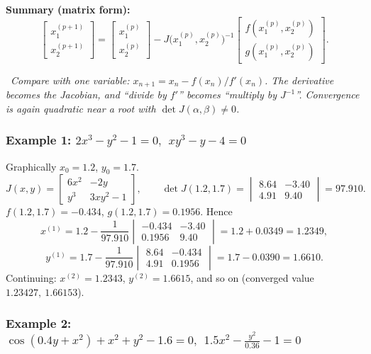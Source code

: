 \documentclass[hidelinks]{article}
\newcommand{\callout}[1]{\par\smallskip\noindent{\color{capri}$\blacktriangleright$}\ \textit{#1}\par\smallskip}
\begin{document}
\textbf{Summary (matrix form):}
\[
\begin{bmatrix}x_1^{(p+1)}\\x_2^{(p+1)}\end{bmatrix}=\begin{bmatrix}x_1^{(p)}\\x_2^{(p)}\end{bmatrix}-J\big(x_1^{(p)},x_2^{(p)}\big)^{-1}\begin{bmatrix}f(x_1^{(p)},x_2^{(p)})\\ g(x_1^{(p)},x_2^{(p)})\end{bmatrix}.
\]
\callout{Compare with one variable: $x_{n+1}=x_n-f(x_n)/f'(x_n)$. The derivative becomes the Jacobian, and ``divide by $f'$'' becomes ``multiply by $J^{-1}$''. Convergence is again quadratic near a root with $\det J(\alpha,\beta)\neq0$.}

\subsubsection{Example 1: $2x^3-y^2-1=0,\ \ xy^3-y-4=0$}

Graphically $x_0=1.2$, $y_0=1.7$.
\[
J(x,y)=\begin{bmatrix}6x^2&-2y\\ y^3&3xy^2-1\end{bmatrix},\qquad
\det J(1.2,1.7)=\begin{vmatrix}8.64&-3.40\\4.91&9.40\end{vmatrix}=97.910 .
\]
$f(1.2,1.7)=-0.434$, $g(1.2,1.7)=0.1956$. Hence
\[
x^{(1)}=1.2-\frac{1}{97.910}\begin{vmatrix}-0.434&-3.40\\0.1956&9.40\end{vmatrix}=1.2+0.0349=1.2349,
\]
\[
y^{(1)}=1.7-\frac{1}{97.910}\begin{vmatrix}8.64&-0.434\\4.91&0.1956\end{vmatrix}=1.7-0.0390=1.6610 .
\]
Continuing: $x^{(2)}=1.2343$, $y^{(2)}=1.6615$, and so on (converged value $1.23427,\ 1.66153$).

\subsubsection{Example 2: $\cos(0.4y+x^2)+x^2+y^2-1.6=0,\ \ 1.5x^2-\frac{y^2}{0.36}-1=0$}
\end{document}
